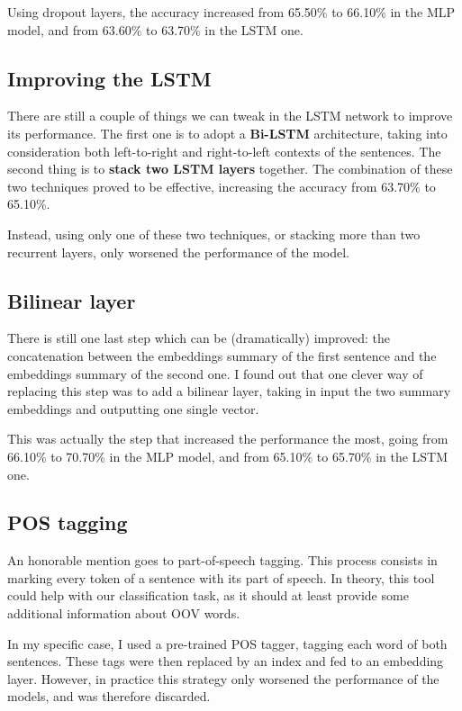 \documentclass[11pt,a4paper]{article}
\begin{document}
	Using dropout layers, the accuracy increased from 65.50\% to 66.10\% in the MLP model, and from 63.60\% to 63.70\% in the LSTM one.
	
	\subsection{Improving the LSTM}
	There are still a couple of things we can tweak in the LSTM network to improve its performance. The first one is to adopt a \textbf{Bi-LSTM} architecture, taking into consideration both left-to-right and right-to-left contexts of the sentences. The second thing is to \textbf{stack two LSTM layers} together. The combination of these two techniques proved to be effective, increasing the accuracy from 63.70\% to 65.10\%.
	
	 Instead, using only one of these two techniques, or stacking more than two recurrent layers, only worsened the performance of the model.
	
	\subsection{Bilinear layer}
	There is still one last step which can be (dramatically) improved: the concatenation between the embeddings summary of the first sentence and the embeddings summary of the second one. I found out that one clever way of replacing this step was to add a bilinear layer, taking in input the two summary embeddings and outputting one single vector.
	
	This was actually the step that increased the performance the most, going from 66.10\% to 70.70\% in the MLP model, and from 65.10\% to 65.70\% in the LSTM one.
	
	\subsection{POS tagging}
	An honorable mention goes to part-of-speech tagging. This process consists in marking every token of a sentence with its part of speech. In theory, this tool could help with our classification task, as it should at least provide some additional information about OOV words.
	
	In my specific case, I used a pre-trained POS tagger, tagging each word of both sentences. These tags were then replaced by an index and fed to an embedding layer. However, in practice this strategy only worsened the performance of the models, and was therefore discarded.
	
\end{document}
